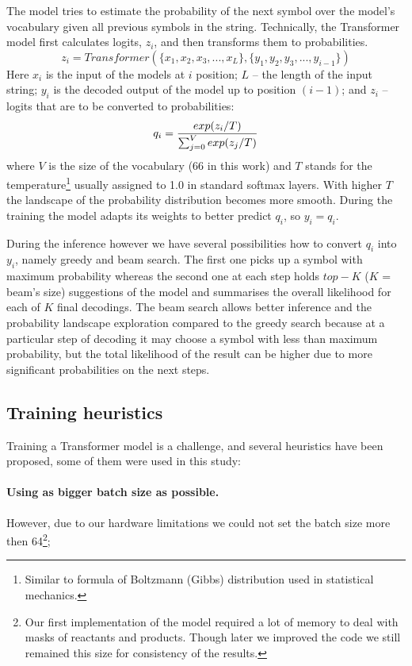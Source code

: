 \documentclass{article}
\begin{document}
The model tries to estimate the probability of the next symbol over the model's vocabulary given all previous symbols in the string. Technically, the Transformer model first calculates logits, $z_i$, and then transforms them to probabilities. 
\begin{equation}
z_i = Transformer( \{x_1, x_2, x_3, ..., x_L\}, \{y_1, y_2, y_3, ..., y_{i-1} \})
\end{equation}
Here $x_i$ is the input of the models at $i$ position; $L$ -- the length of the input string; $y_i$ is the decoded output of the model up to position $(i-1)$; and $z_i$ -- logits that are to be converted to probabilities:
\begin{equation}
\label{eq:tempdep}
q_i = {{exp(z_i /T) }\over {\sum_{j=0}^{V} exp(z_j /T) }}
\end{equation}
where $V$ is the size of the vocabulary (66 in this work) and $T$ stands for the temperature\footnote{Similar to formula of Boltzmann (Gibbs) distribution used in statistical mechanics.} usually assigned to 1.0 in standard softmax layers. With higher $T$ the landscape of the probability distribution becomes more smooth. During the training the model adapts its weights to better predict $q_i$, so $y_i = q_i$. 

During the inference however we have several possibilities how to convert $q_i$ into $y_i$, namely greedy and beam search. The first one picks up a symbol with maximum probability whereas the second one at each step holds $top-K$ ($K$ = beam's size) suggestions of the model and summarises the overall likelihood for each of $K$ final decodings. The beam search allows better inference and the probability landscape exploration compared to the greedy search because at a particular step of decoding it may choose a symbol with less than maximum probability, but the total likelihood of the result can be higher due to more significant probabilities on the next steps.

\subsection{Training heuristics}
Training a Transformer model is a challenge, and several heuristics have been proposed\cite{TransformerTips}, some of them were used in this study:

\paragraph{Using as bigger batch size as possible.} However, due to our hardware limitations we could not set the batch size more then 64\footnote{Our first implementation of the model required a lot of memory to deal with masks of reactants and products. Though later we improved the code we still remained this size for consistency of the results.};
\end{document}
